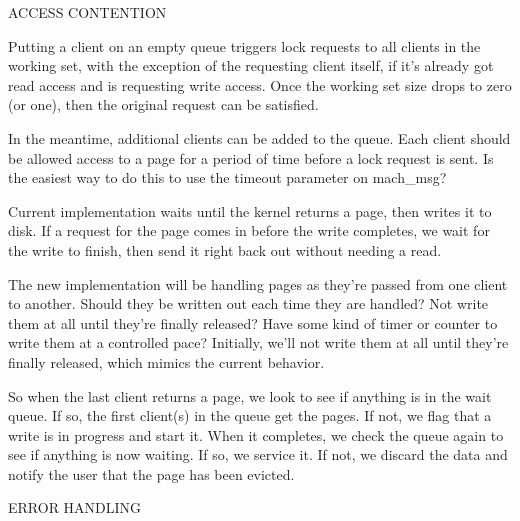 \documentclass{article}
\begin{document}
\begin{comment}
Once we hit our seventh client, or some oddball condition (like an
error return other than the expected KERN_SUCCESS, or a sixth client
on the WAITLIST), we shift to a pointer that points to a more
complicated, dynamically allocated structure.

Likewise, a 64-bit pointer (wishful thinking at the moment, since Hurd
is currently a 32-bit system) would allow fifteen clients, with an
eleven client WAITLIST.  Both the 32-bit and the 64-bit scheme have
two bits left over, perhaps they could be used to allow EIO, ENOSPC,
and EDQUOT, in addition to KERN_SUCCESS, since these seem to be the
most likely error codes.

\end{comment}

ACCESS CONTENTION

Putting a client on an empty queue triggers lock requests to all
clients in the working set, with the exception of the requesting
client itself, if it's already got read access and is requesting write
access.  Once the working set size drops to zero (or one), then the
original request can be satisfied.

In the meantime, additional clients can be added to the queue.  Each
client should be allowed access to a page for a period of time before
a lock request is sent.  Is the easiest way to do this to use the
timeout parameter on mach_msg?

Current implementation waits until the kernel returns a page, then
writes it to disk.  If a request for the page comes in before the
write completes, we wait for the write to finish, then send it right
back out without needing a read.

The new implementation will be handling pages as they're passed from
one client to another.  Should they be written out each time they are
handled?  Not write them at all until they're finally released?  Have
some kind of timer or counter to write them at a controlled pace?
Initially, we'll not write them at all until they're finally released,
which mimics the current behavior.

So when the last client returns a page, we look to see if anything is
in the wait queue.  If so, the first client(s) in the queue get the
pages.  If not, we flag that a write is in progress and start it.
When it completes, we check the queue again to see if anything is now
waiting.  If so, we service it.  If not, we discard the data and
notify the user that the page has been evicted.


ERROR HANDLING
\end{document}
